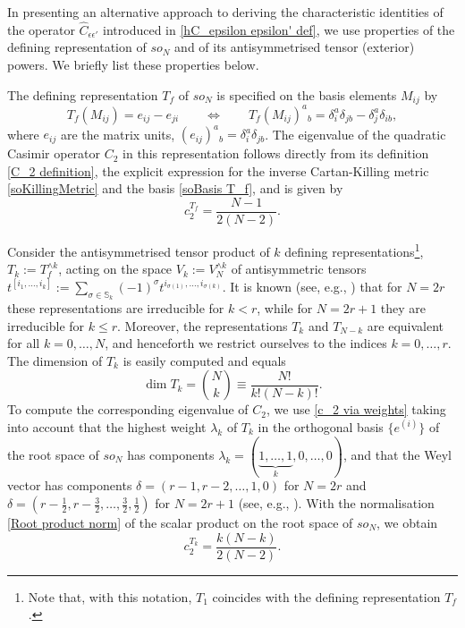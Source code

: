 \documentclass[a4paper]{article}
\newcommand{\hC}{\widehat{C}}
\renewcommand{\=}{\ =\ }
\numberwithin{equation}{section}
\theoremstyle{remark}
\begin{document}
In presenting an alternative approach to deriving the characteristic identities of the operator $\hC_{\epsilon\epsilon'}$ introduced in \eqref{hC_epsilon epsilon' def}, we use properties of the defining representation of $so_N$ and of its antisymmetrised tensor (exterior) powers. We briefly list these properties below.

The defining representation $T_f$ of $so_N$ is specified on the basis elements $M_{ij}$ by
\begin{equation}\label{soBasis T_f}
T_f(M_{ij})=e_{ij}-e_{ji}
\qquad \iff\qquad
T_f(M_{ij})^a{}_b=\delta^a_i\delta_{jb}-\delta^a_j\delta_{ib},
\end{equation}
where $e_{ij}$ are the matrix units, $(e_{ij})^a{}_b=\delta^a_i\delta_{jb}$. The eigenvalue of the quadratic Casimir operator $C_2$ in this representation follows directly from its definition \eqref{C_2 definition}, the explicit expression for the inverse Cartan-Killing metric \eqref{soKillingMetric} and the basis \eqref{soBasis T_f}, and is given by
\begin{equation}\label{c_2 on T_f}
c_2^{T_f}=\frac{N-1}{2(N-2)}.
\end{equation}

Consider the antisymmetrised tensor product of $k$ defining representations\footnote{Note that, with this notation, $T_1$ coincides with the defining representation $T_f$.}, $T_k:=T_f^{\wedge k}$, acting on the space $V_k:=V_N^{\wedge k}$ of antisymmetric tensors $t^{[i_1,\dots,i_k]} := \sum_{\sigma\in\mathbb{S}_k}(-1)^\sigma t^{i_{\sigma(1)},\dots,i_{\sigma(k)}}$. It is known (see, e.g., \cite{IsRu2}) that for $N=2r$ these representations are irreducible for $k<r$, while for $N=2r+1$ they are irreducible for $k\le r$. Moreover, the representations $T_k$ and $T_{N-k}$ are equivalent for all $k=0,\dots,N$, and henceforth we restrict ourselves to the indices $k=0,\dots,r$. The dimension of $T_k$ is easily computed and equals
\begin{equation}\label{T_f^(wedge k) dimension}
\dim T_k={N\choose k}\equiv \frac{N!}{k!(N-k)!}.
\end{equation}
To compute the corresponding eigenvalue of $C_2$, we use \eqref{c_2 via weights} taking into account that the highest weight $\lambda_k$ of $T_k$ in the orthogonal basis $\{e^{(i)}\}$ of the root space of $so_N$ has components $\lambda_k=(\underbrace{1,\dots,1}_{k},0,\dots,0)$, and that the Weyl vector has components $\delta=(r-1,r-2,\dots,1,0)$ for $N=2r$ and $\delta=(r-\frac{1}{2},r-\frac{3}{2},\dots,\frac{3}{2},\frac{1}{2})$ for $N=2r+1$ (see, e.g., \cite{IsRu2}). With the normalisation \eqref{Root product norm} of the scalar product on the root space of $so_N$, we obtain
\begin{equation}\label{c_2 on T_f^(wedge k)}
c_2^{T_k}=\frac{k(N-k)}{2(N-2)}.
\end{equation}
\end{document}

